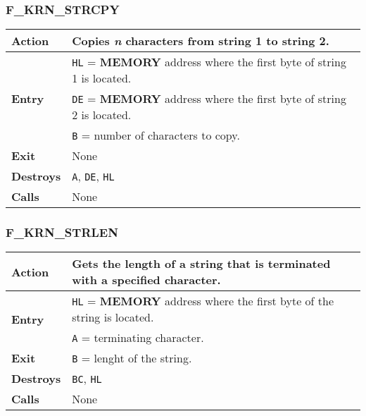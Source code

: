    \subsubsection{F\_KRN\_STRCPY}
    \label{func:fkrnstrcpy}
    \begin{tabular}{l p{15cm}}
        \hline\textbf{Action}
        & Copies \textit{n} characters from string 1 to string 2.\\
        \hline\multirow[t]{3}{4em}{\textbf{Entry}}
        & \texttt{HL} = \textbf{MEMORY} address where the first byte of
        string 1 is located.\\
        & \texttt{DE} = \textbf{MEMORY} address where the first byte of
        string 2 is located.\\
        & \texttt{B} = number of characters to copy.\\
        \hline\textbf{Exit} & None\\
        \hline\textbf{Destroys} & \texttt{A}, \texttt{DE}, \texttt{HL}\\
        \hline\textbf{Calls} & None\\
        \hline
    \end{tabular}

    \subsubsection{F\_KRN\_STRLEN}
    \label{func:fkrnstrlen}
    \begin{tabular}{l p{15cm}}
        \hline\textbf{Action}
        & Gets the length of a string that is terminated with a specified
        character.\\
        \hline\multirow[t]{2}{4em}{\textbf{Entry}}
        & \texttt{HL} = \textbf{MEMORY} address where the first byte of the
        string is located.\\
        & \texttt{A} = terminating character.\\
        \hline\textbf{Exit} & \texttt{B} = lenght of the string.\\
        \hline\textbf{Destroys} & \texttt{BC}, \texttt{HL}\\
        \hline\textbf{Calls} & None\\
        \hline
    \end{tabular}

